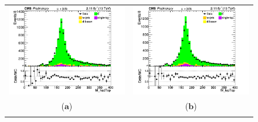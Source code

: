 \documentclass{cmspaper}
\begin{document}
\begin{figure}[htp]
\centering
\begin{tabular}{cc}
\hspace{-0.5cm}
\includegraphics[scale=0.40]{results/M_hadTop.png}
& \hspace{-0.5cm} \includegraphics[scale=0.40]{results/M_lepTop.png}\\
   ($\mathbf{a}$)\qquad\qquad&($\mathbf{b}$)\qquad\qquad\qquad\\
\hspace{-0.5cm}

\end{tabular}
\end{figure}
\end{document}
